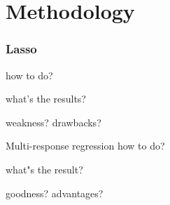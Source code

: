 \section{Methodology}
\begin{frame}
    \sectionpage
\end{frame}

\begin{frame}
    \frametitle{Lasso}

    how to do?

    what's the results?

    weakness? drawbacks?
\end{frame}

\begin{frame}{Multi-response regression}
    how to do? 

    what"s the result?

    goodness? advantages?
    
\end{frame}
